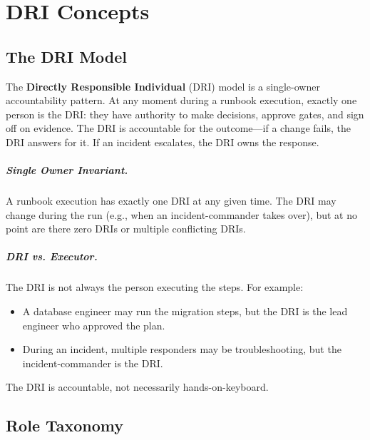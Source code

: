 \chapter{DRI Concepts}
\label{ch:dri-concepts}

\section{The DRI Model}

The \textbf{Directly Responsible Individual} (DRI) model is a single-owner accountability pattern. At any moment during a runbook execution, exactly one person is the DRI: they have authority to make decisions, approve gates, and sign off on evidence. The DRI is accountable for the outcome---if a change fails, the DRI answers for it. If an incident escalates, the DRI owns the response.

\paragraph{Single Owner Invariant.}
A runbook execution has exactly one DRI at any given time. The DRI may change during the run (e.g., when an incident-commander takes over), but at no point are there zero DRIs or multiple conflicting DRIs.

\paragraph{DRI vs. Executor.}
The DRI is not always the person executing the steps. For example:
\begin{itemize}
  \item A database engineer may run the migration steps, but the DRI is the lead engineer who approved the plan.
  \item During an incident, multiple responders may be troubleshooting, but the incident-commander is the DRI.
\end{itemize}

The DRI is accountable, not necessarily hands-on-keyboard.

\section{Role Taxonomy}
\label{sec:role-taxonomy}

